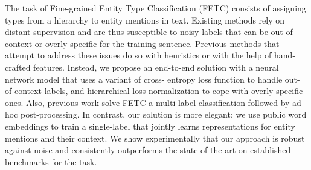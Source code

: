 The task of Fine-grained Entity Type Classification (FETC) consists of assigning types from a hierarchy to entity mentions in text. Existing methods rely on distant supervision and are thus susceptible to noisy labels that can be out-of-context or overly-specific for the training sentence. Previous methods that attempt to address these issues do so with heuristics or with the help of hand-crafted features. Instead, we propose an end-to-end solution with a neural network model that uses a variant of cross- entropy loss function to handle out-of-context labels, and hierarchical loss normalization to cope with overly-specific ones. Also, previous work solve FETC a multi-label classification followed by ad-hoc post-processing. In contrast, our solution is more elegant: we use public word embeddings to train a single-label that jointly learns representations for entity mentions and their context. We show experimentally that our approach is robust against noise and consistently outperforms the state-of-the-art on established benchmarks for the task.
